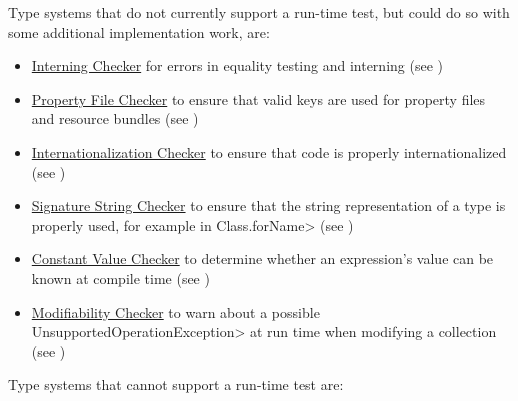 Type systems that do not currently support a run-time test, but could do so with some
additional implementation work, are:

\begin{itemize}
\item
  \hyperref[interning-checker]{Interning Checker} for errors in equality
  testing and interning (see )
\item
  \hyperref[propkey-checker]{Property File Checker} to ensure that valid
  keys are used for property files and resource bundles (see
  )
\item
  \hyperref[i18n-checker]{Internationalization Checker} to
  ensure that code is properly internationalized (see
  )
\item
  \hyperref[signature-checker]{Signature String Checker} to ensure that the
  string representation of a type is properly used, for example in
  \<Class.forName> (see )
\item
  \hyperref[constant-value-checker]{Constant Value Checker} to determine
  whether an expression's value can be known at compile time
  (see )
\item
  \hyperref[modifiability-checker]{Modifiability Checker} to
  warn about a possible \<UnsupportedOperationException> at run time when
  modifying a collection
  (see )
\end{itemize}


Type systems that cannot support a run-time test are:

